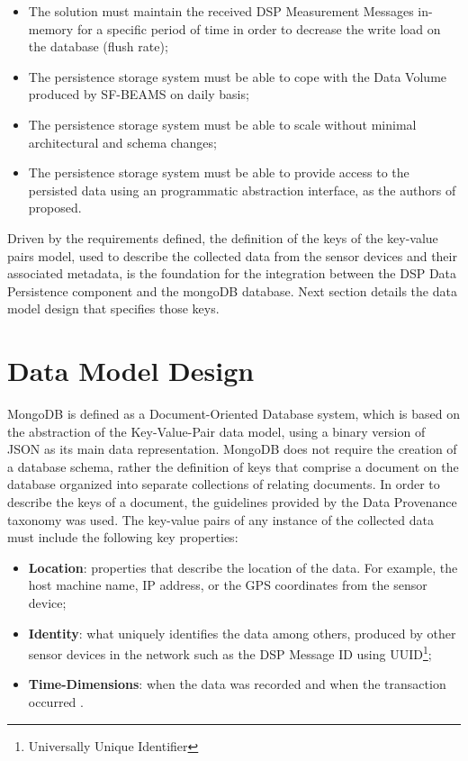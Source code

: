 \begin{itemize}
  \item The solution must maintain the received DSP Measurement Messages
  in-memory for a specific period of time in order to decrease the write load
  on the database (flush rate);
  \item The persistence storage system must be able to cope with the Data
  Volume produced by SF-BEAMS on daily basis;
  \item The persistence storage system must be able to scale without minimal
  architectural and schema changes;
  \item The persistence storage system must be able to provide access to the
  persisted data using an programmatic abstraction interface, as the authors
  of \cite{sn-programming-language} proposed.
\end{itemize}

Driven by the requirements defined, the definition of the keys of the key-value
pairs model, used to describe the collected data from the sensor devices and
their associated metadata, is the foundation for the integration between the
DSP Data Persistence component and the mongoDB database. Next section details
the data model design that specifies those keys.

\section{Data Model Design}
\label{sec:dsp-persistence-data-model}

MongoDB is defined as a Document-Oriented Database system, which is based on 
the abstraction of the Key-Value-Pair data model, using a binary version of JSON
\cite{json} as its main data representation. MongoDB does not require the creation 
of a database schema, rather the definition of keys that comprise a document on
the database organized into separate collections of relating documents. In
order to describe the keys of a document, the guidelines provided by the Data
Provenance taxonomy was used. The key-value pairs of any instance of the
collected data must include the following key properties:

\begin{itemize}
  \item \textbf{Location}: properties that describe the location of the data.
  For example, the host machine name, IP address, or the GPS coordinates
  \cite{gps} from the sensor device;
  \item \textbf{Identity}: what uniquely identifies the data among 
  others, produced by other sensor devices in the network such as the DSP
  Message ID using UUID\footnote{Universally Unique Identifier};
  \item \textbf{Time-Dimensions}: when the data was recorded 
  \cite{db-provenance} and when the transaction occurred \cite{sn-time-series}.
\end{itemize}

